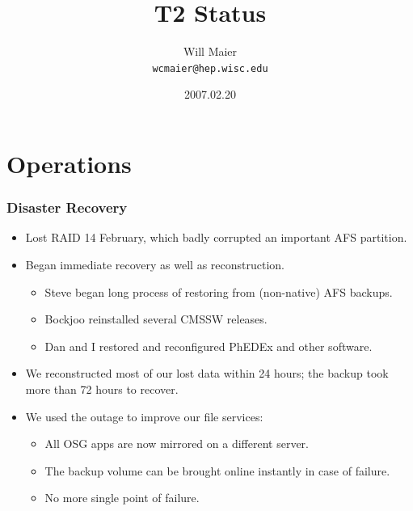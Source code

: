 \documentclass{beamer}
\title{T2 Status}
\author[Will Maier]{Will Maier \\ \texttt{wcmaier@hep.wisc.edu}}
\institute[Wisconsin]{University of Wisconsin - High Energy Physics}
\date{2007.02.20}
\begin{document}



\section{Operations}
\begin{frame}
    \frametitle{Disaster Recovery}
    \begin{itemize}
        \item Lost RAID 14 February, which badly corrupted an important AFS partition.
        \item Began immediate recovery as well as reconstruction.
        \begin{itemize}
            \item Steve began long process of restoring from (non-native) AFS backups.
            \item Bockjoo reinstalled several CMSSW releases.
            \item Dan and I restored and reconfigured PhEDEx and other software.
        \end{itemize}
        \item We reconstructed most of our lost data within 24 hours; the backup took more than 72 hours to recover.
        \item We used the outage to improve our file services:
        \begin{itemize}
            \item All OSG apps are now mirrored on a different server.
            \item The backup volume can be brought online instantly in case of failure.
            \item No more single point of failure.
        \end{itemize}
    \end{itemize}
\end{frame}
\end{document}
